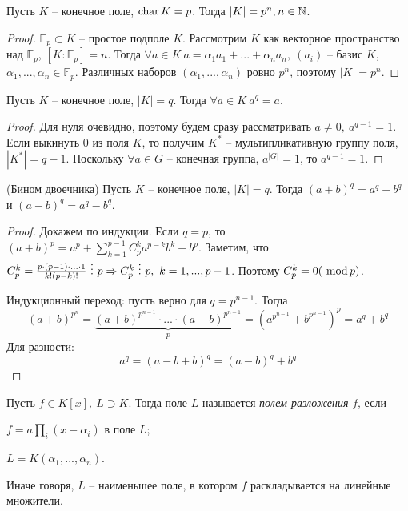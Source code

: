 
\begin{Thm}
	Пусть $K$ -- конечное поле, $\operatorname{char} K = p$. Тогда $|K| = p^n, n \in \mathbb{N}$.
\end{Thm}

\begin{proof}
	$\mathbb{F}_p \subset K$ -- простое подполе $K$. Рассмотрим $K$ как векторное пространство над $\mathbb{F}_p$, $[K : \mathbb{F}_p] = n$.
	Тогда $\forall a \in K \ a = \alpha_1 a_1 + ... + \alpha_n a_n, \ (a_i)$ -- базис $K$, $\alpha_1, ..., \alpha_n \in \mathbb{F}_p$. Различных наборов $(\alpha_1, ..., \alpha_n)$ ровно $p^n$, поэтому $|K| = p^n$.  
\end{proof}

\begin{Lm}
	Пусть $K$ -- конечное поле, $|K| = q$. Тогда $\forall a \in K \ a^q = a$.
\end{Lm}

\begin{proof}
	Для нуля очевидно, поэтому будем сразу рассматривать $a \neq 0, \ a^{q - 1} = 1$.
	Если выкинуть 0 из поля $K$, то получим $K^*$ -- мультипликативную группу поля, $|K^*| = q - 1$.
	Поскольку $\forall a \in G$ -- конечная группа, $a^{|G|} = 1$, то $a^{q - 1} = 1$.  
\end{proof}

\begin{Lm}(Бином двоечника)
	Пусть $K$ -- конечное поле, $|K| = q$. Тогда $(a + b)^q = a^q + b^q$ и $(a - b)^q = a^q - b^q$.  
\end{Lm}

\begin{proof}
	Докажем по индукции. Если $q = p$, то $(a + b)^p = a^p + \sum_{k = 1}^{p - 1} C_p^k a^{p - k}b^k + b^p$.
	Заметим, что $C_p^k = \frac{p \cdot (p - 1) \cdot ... \cdot 1}{k!(p - k)!} \ \vdots \ p \Rightarrow C_p^k \ \vdots \ p, \ k = 1, ..., p - 1$.
	Поэтому $C_p^k = 0 (\ \mathrm{mod}\, p)$.
	
	Индукционный переход: пусть верно для $q = p^{n - 1}$. Тогда
	\[(a + b)^{p^n} = \underbrace{(a+b)^{p^{n - 1}} \cdot ... \cdot (a+b)^{p^{n - 1}}}_p = \left(a^{p^{n - 1}} + b^{p^{n - 1}}\right)^p = a^q + b^q\]
	Для разности: 
	\[a^q = (a - b + b)^q = (a - b)^q + b^q\] 
\end{proof}

\begin{Def}
	Пусть $f \in K[x], \ L \supset K$. Тогда поле $L$ называется \textit{полем разложения} $f$, если  
	\begin{MyList}
		\item $f = a \prod_i (x - \alpha_i)$ в поле $L$;
		\item $L = K (\alpha_1, ..., \alpha_n)$.  
	\end{MyList}

	Иначе говоря, $L$ -- наименьшее поле, в котором $f$ раскладывается на линейные множители.
\end{Def}

